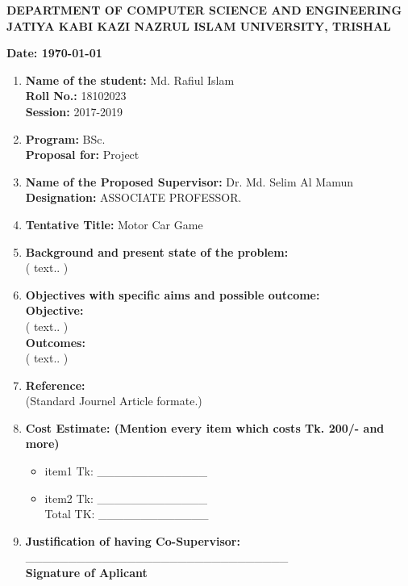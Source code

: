 \documentclass[12pt,a4paper]{article}
\begin{document}
	\begin{center}
		\textbf{DEPARTMENT OF COMPUTER SCIENCE AND ENGINEERING \\
		    	JATIYA KABI KAZI NAZRUL ISLAM UNIVERSITY, TRISHAL } \\
	\end{center}
	\begin{flushright}
		\textbf{Date: \today }
	\end{flushright}
	\begin{enumerate}
		\item \textbf{Name of the student:}  Md. Rafiul Islam \\
				\textbf{Roll No.:} 18102023 \\
				\textbf{Session:} 2017-2019 
		\item   \textbf{Program:}  BSc. \\
				\textbf{Proposal for:} Project 
		\item	\textbf{Name of the Proposed Supervisor:}   Dr. Md. Selim Al Mamun \\
				\textbf{Designation:}  ASSOCIATE PROFESSOR. 
		\item	\textbf{Tentative Title:} Motor Car Game  
		\item 	\textbf{Background and present state of the problem:} \\
				 ( text.. )
		\item \textbf{Objectives with specific aims and possible outcome:}  \\
				\textbf{Objective:}\\
				 ( text.. ) \\
				\textbf{Outcomes:} \\
				 ( text.. )	
		\item \textbf{Reference:} \\ 
				(Standard Journel Article formate.) 
		\item \textbf{Cost Estimate: (Mention every item which costs Tk. 200/- and more)} 
			  \begin{itemize}
			  		\item item1 \hspace{5mm} Tk: \_\_\_\_\_\_\_\_\_\_\_\_\_
			  		\item item2 \hspace{5mm} Tk: \_\_\_\_\_\_\_\_\_\_\_\_\_ \\
			  		Total TK:\hspace{7mm} \_\_\_\_\_\_\_\_\_\_\_\_\_
			  \end{itemize}
		\item \textbf{Justification of having Co-Supervisor: } \\
			  \_\_\_\_\_\_\_\_\_\_\_\_\_\_\_\_\_\_\_\_\_\_\_\_\_\_\_\_\_\_\_\\
			  \textbf{Signature of Aplicant}
	\end{enumerate}
\end{document}
